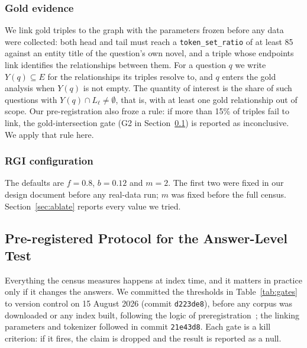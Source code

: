 \documentclass{ieeeaccess}
\theoremstyle{remark}
\begin{document}
\subsubsection{Gold evidence}
We link gold triples to the graph with the parameters frozen before any data were collected: both head and tail must reach a \texttt{token\_set\_ratio} of at least 85 against an entity title of the question's own novel, and a triple whose endpoints link identifies the relationships between them. For a question $q$ we write $Y(q)\subseteq E$ for the relationships its triples resolve to, and $q$ enters the gold analysis when $Y(q)$ is not empty. The quantity of interest is the share of such questions with $Y(q)\cap L_\ell\neq\emptyset$, that is, with at least one gold relationship out of scope. Our pre-registration also froze a rule: if more than 15\% of triples fail to link, the gold-intersection gate (G2 in Section~\ref{sec:protocol}) is reported as inconclusive. We apply that rule here.

\subsubsection{RGI configuration}
The defaults are $f=0.8$, $b=0.12$ and $m=2$. The first two were fixed in our design document before any real-data run; $m$ was fixed before the full census. Section~\ref{sec:ablate} reports every value we tried.

\subsection{Pre-registered Protocol for the Answer-Level Test}\label{sec:protocol}

Everything the census measures happens at index time, and it matters in practice only if it changes the answers. We committed the thresholds in Table~\ref{tab:gates} to version control on 15 August 2026 (commit \texttt{d223de8}), before any corpus was downloaded or any index built, following the logic of preregistration~\cite{nosek2018prereg}; the linking parameters and tokenizer followed in commit \texttt{21e43d8}. Each gate is a kill criterion: if it fires, the claim is dropped and the result is reported as a null.
\end{document}
